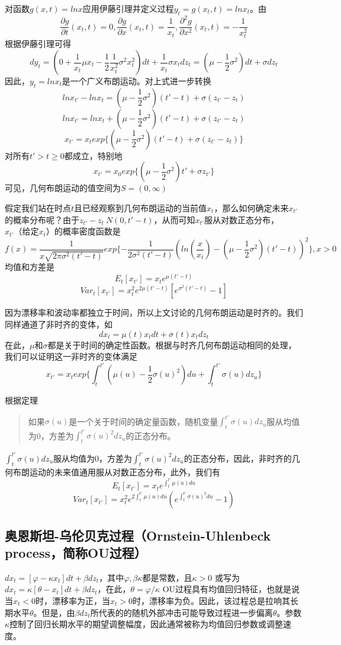 \documentclass[UTF8]{ctexart}
\begin{document}
对函数$g(x,t)=lnx$应用伊藤引理并定义过程$y_t=g(x_t,t)=lnx_t$。由
$$\frac{\partial g}{\partial t}(x_t,t)=0,\frac{\partial g}{\partial x}(x_t,t)=\frac{1}{x_t},\frac{\partial^2 g}{\partial x^2}(x_t,t)=-\frac{1}{x_t^2}$$
根据伊藤引理可得
$$dy_t=(0+\frac{1}{x_t}\mu x_t-\frac{1}{2} \frac{1}{x_t^2} \sigma^2 x_t^2)dt+\frac{1}{x_t}\sigma x_t dz_t=(\mu-\frac{1}{2}\sigma^2)dt+\sigma dz_t$$
因此，$y_t=lnx_t$是一个广义布朗运动。对上式进一步转换
$$lnx_{t'}-lnx_t=(\mu-\frac{1}{2}\sigma^2)(t'-t)+\sigma (z_{t'}-z_t)$$
$$lnx_{t'}=lnx_t+(\mu-\frac{1}{2}\sigma^2)(t'-t)+\sigma (z_{t'}-z_t)$$
$$x_{t'}=x_t exp\{ (\mu-\frac{1}{2}\sigma^2)(t'-t)+\sigma (z_{t'}-z_t) \}$$
对所有$t'>t \geqslant 0$都成立，特别地
$$x_{t'}=x_0 exp\{ (\mu-\frac{1}{2}\sigma^2)t'+\sigma z_{t'} \}$$
可见，几何布朗运动的值空间为$S=(0,\infty)$

假定我们站在时点$t$且已经观察到几何布朗运动的当前值$x_t$，那么如何确定未来$x_{t'}$的概率分布呢？由于$z_{t'}-z_t~N(0,t'-t)$，从而可知$x_{t'}$服从对数正态分布，$x_{t'}\text{（给定}x_t \text{）}$的概率密度函数是
$$f(x)=\frac{1}{x \sqrt{2 \pi \sigma^2 (t'-t)}}exp\{ -\frac{1}{2 \sigma^2(t'-t)}(ln(\frac{x}{x_t})-(\mu-\frac{1}{2}\sigma^2)(t'-t))^2 \},x>0$$
均值和方差是
$$E_t[x_{t'}]=x_t e^{\mu(t'-t)}$$
$$Var_t[x_{t'}]=x_t^2 e^{2 \mu (t'-t)}[e^{\sigma^2(t'-t)}-1]$$

因为漂移率和波动率都独立于时间，所以上文讨论的几何布朗运动是时齐的。我们同样通道了非时齐的变体，如
$$dx_t=\mu(t)x_t dt+\sigma(t) x_t dz_t$$
在此，$\mu$和$\sigma$都是关于时间的确定性函数。根据与时齐几何布朗运动相同的处理，我们可以证明这一非时齐的变体满足
$$x_{t'}=x_t exp\{ \int_t^{t'}(\mu(u)-\frac{1}{2}\sigma(u)^2)du+\int_t^{t'}\sigma(u)dz_u \}$$

根据定理
\begin{quote}
\kaishu
如果$\sigma(u)$是一个关于时间的确定量函数，随机变量$\int_t^{t'}\sigma(u) dz_u$服从均值为0，方差为$\int_t^{t'}\sigma(u)^2 dz_u$的正态分布。
\end{quote}
$\int_t^{t'}\sigma(u) dz_u$服从均值为0，方差为$\int_t^{t'}\sigma(u)^2 dz_u$的正态分布，因此，非时齐的几何布朗运动的未来值通用服从对数正态分布，此外，我们有
$$E_t[x_{t'}]=x_t e^{\int_t^{t'}\mu(u)du}$$
$$Var_t[x_{t'}]=x_t^2 e^{2 \int_t^{t'}\mu(u)du}(e^{\int_t^{t'}\sigma(u)^2 du}-1)$$
\subsection{奥恩斯坦-乌伦贝克过程（Ornstein-Uhlenbeck process，简称OU过程）}
$dx_t=[\varphi - \kappa x_t]dt+\beta dz_t$，其中$\varphi,\beta\kappa$都是常数，且$\kappa>0$
或写为$dx_t=\kappa[\theta- x_t]dt+\beta dz_t$，在此，$\theta=\varphi/\kappa$
OU过程具有均值回归特征，也就是说当$x_t<0$时，漂移率为正，当$x_t>0$时，漂移率为负。因此，该过程总是拉响其长期水平$\theta$。但是，由$\beta dz_t$所代表的的随机外部冲击可能导致过程进一步偏离$\theta$。参数$\kappa$控制了回归长期水平的期望调整幅度，因此通常被称为均值回归参数或调整速度。
\end{document}
